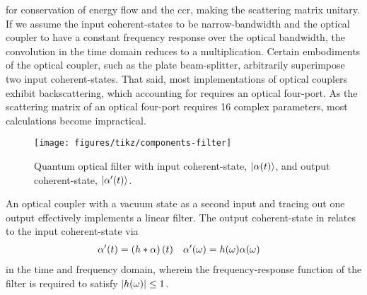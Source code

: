 for conservation of energy flow and the \gls{ccr}, making the scattering matrix unitary.
If we assume the input coherent-states to be narrow-bandwidth and the optical coupler to have a constant frequency response over the optical bandwidth, the convolution in the time domain reduces to a multiplication.
Certain embodiments of the optical coupler, such as the plate beam-splitter, arbitrarily superimpose two input coherent-states.
That said, most implementations of optical couplers exhibit backscattering, which accounting for requires an optical four-port.
As the scattering matrix of an optical four-port requires \num{16} complex parameters, most calculations become impractical.
\begin{figure}[htb]
    \centering
    \texttt{[image: figures/tikz/components-filter]}
    \caption{Quantum optical filter with input coherent-state, $\lvert\alpha(t)\rangle$, and output coherent-state, $\lvert\alpha^\prime(t)\rangle$.}\label{fig:components_filter}
\end{figure}
An optical coupler with a vacuum state as a second input and tracing out one output effectively implements a linear filter.
The output coherent-state in  relates to the input coherent-state via
\begin{align*}
	\alpha^\prime(t)
	&=
	\left(h\ast\alpha\right)(t)
	&
	\alpha^\prime(\omega)
	&=
	h(\omega)
	\alpha(\omega)
\end{align*}
in the time and frequency domain, wherein the frequency-response function of the filter is required to satisfy $\lvert h(\omega)\rvert\leq1$.

